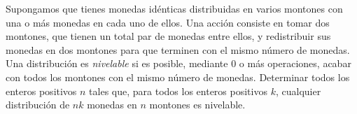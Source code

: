 Supongamos que tienes monedas idénticas distribuidas en varios montones con una o más monedas en cada uno de ellos. Una acción consiste en tomar dos montones, que tienen un total par de monedas entre ellos, y redistribuir sus monedas en dos montones para que terminen con el mismo número de monedas. 
Una distribución es \textit{nivelable} si es posible, mediante 0 o más operaciones, acabar con todos los montones con el mismo número de monedas.
Determinar todos los enteros positivos $n$ tales que, para todos los enteros positivos $k$, cualquier distribución de $nk$ monedas en $n$ montones es nivelable.
